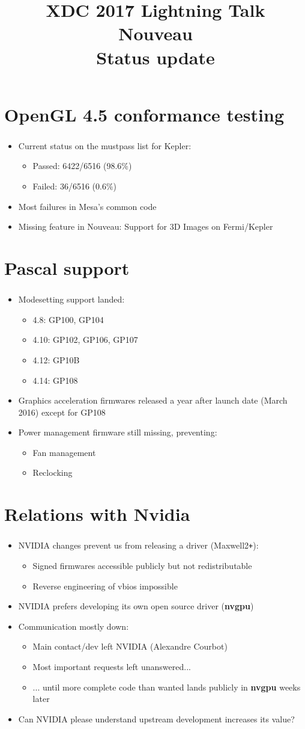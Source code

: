\documentclass[aspectratio=169,english]{beamer}
\newcommand*{\ft}{\frametitle{\secname}}
\newcommand*{\itemp}{\item}
\newcommand*{\+}{\texttt{+}}
\newcommand{\sectionframeimpl}[2]{
	\begin{frame}
	#1
	\begin{itemize}
	#2
	\end{itemize}
	\end{frame}
}
\newcommand{\sectionframe}[2]{
	\section{#1}
	\sectionframeimpl{\ft}{#2}
}
\begin{document}
\title[Nouveau]{XDC 2017 Lightning Talk \\ Nouveau \\ Status update}
\date{}

\begin{frame}
\titlepage
\end{frame}

\sectionframe{OpenGL 4.5 conformance testing}{
	\itemp Current status on the mustpass list for Kepler:
	\begin{itemize}
		\itemp Passed: 6422/6516 (98.6\%)
		\itemp Failed: 36/6516 (0.6\%)
	\end{itemize}
	\itemp Most failures in Mesa's common code
	\itemp Missing feature in Nouveau: Support for 3D Images on Fermi/Kepler
}

\sectionframe{Pascal support}{
	\itemp Modesetting support landed:
	\begin{itemize}
		\itemp 4.8: GP100, GP104
		\itemp 4.10: GP102, GP106, GP107
		\itemp 4.12: GP10B
		\itemp 4.14: GP108
	\end{itemize}
	\itemp Graphics acceleration firmwares released a year after launch date (March 2016) except for GP108
	\itemp Power management firmware still missing, preventing:
	\begin{itemize}
		\itemp Fan management
		\itemp Reclocking
	\end{itemize}
}

\sectionframe{Relations with Nvidia} {
	\itemp NVIDIA changes prevent us from releasing a driver (Maxwell2\+):
	\begin{itemize}
		\itemp Signed firmwares accessible publicly but not redistributable
		\itemp Reverse engineering of vbios impossible
	\end{itemize}
     \itemp NVIDIA prefers developing its own open source driver (\textbf{nvgpu})
	\itemp Communication mostly down:
	\begin{itemize}
		\itemp Main contact/dev left NVIDIA (Alexandre Courbot)
		\itemp Most important requests left unanswered...
		\itemp ... until more complete code than wanted lands publicly in \textbf{nvgpu} weeks later
	\end{itemize}
	\itemp Can NVIDIA please understand upstream development increases its value?
}
\end{document}
